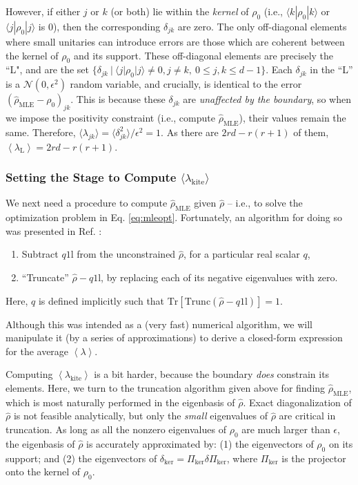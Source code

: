 \documentclass[aps,pra, twocolumn]{revtex4-1}
\newcommand{\Tr}{\mathrm{Tr}}
\newcommand{\Id}{\mathbb{I}}
\newcommand{\expect}[1]{\ensuremath{\left\langle#1\right\rangle}}
\def\Id{1\!\mathrm{l}}
\newcommand{\rhohat}{\hat{\rho}}
\newcommand{\rhoMLE}{\rhohat_{\scriptscriptstyle\mathrm{MLE}}}
\begin{document}
However, if either $j$ or $k$ (or both) lie within the \emph{kernel} of $\rho_{0}$ (i.e., $\langle k | \rho_{0}| k \rangle$ or $\langle j|\rho_{0}|j\rangle$ is 0), then the corresponding $\delta_{jk}$ are zero. The only off-diagonal elements where small unitaries can introduce errors are those which are coherent between the kernel of $\rho_{0}$ and its support. These off-diagonal elements are precisely the ``L", and are  the set $\{\delta_{jk}~|~\langle j | \rho_{0}|j\rangle \neq 0, j\neq k, ~ 0 \leq j,k \leq d - 1\}$. Each $\delta_{jk}$ in the ``L'' is a $\mathcal{N}(0, \epsilon^{2})$ random variable, and crucially, is identical to the error $(\rhoMLE - \rho_{0})_{jk}$. This is because these $\delta_{jk}$ are \emph{unaffected by the boundary}, so when we impose the positivity constraint (i.e., compute $\rhoMLE$), their values remain the same. Therefore, $\langle \lambda_{jk}\rangle = \langle \delta_{jk}^{2}\rangle /\epsilon^{2} = 1$. As there are $2rd - r(r+1)$ of them, $\expect{\lambda_{\mathrm{L}}} = 2rd - r(r+1)$.

\subsubsection{Setting the Stage to Compute $\langle \lambda_\mathrm{kite}\rangle$}

We next need a procedure to compute $\rhoMLE$ given $\rhohat$ -- i.e., to solve the optimization problem in Eq. \eqref{eq:mleopt}.  Fortunately, an algorithm for doing so was presented in Ref. \cite{Smolin2012}:
\begin{enumerate}[noitemsep]
\item Subtract $q\Id$ from the unconstrained $\hat\rho$, for a particular real scalar $q$,
\item ``Truncate'' $\hat\rho-q\Id$, by replacing each of its negative eigenvalues with zero.
\end{enumerate}
Here, $q$ is defined implicitly such that $\Tr\left[ \mathrm{Trunc}(\hat\rho-q\Id)\right] = 1$.

Although this was intended as a (very fast) numerical algorithm, we will manipulate it (by a series of approximations) to derive a closed-form expression for the average $\expect{\lambda}$.  

Computing $\expect{\lambda_{\mathrm{kite}}}$ is a bit harder, because the boundary \emph{does} constrain its elements.  Here, we turn to the truncation algorithm given above for finding $\rhoMLE$, which is most naturally performed in the eigenbasis of $\hat\rho$.  Exact diagonalization of $\hat\rho$ is not feasible analytically, but only the \emph{small} eigenvalues of $\hat\rho$ are critical in truncation.  As long as all the nonzero eigenvalues of $\rho_0$ are much larger than $\epsilon$, the eigenbasis of $\hat\rho$ is accurately approximated by: (1) 
the eigenvectors of $\rho_0$ on its support; and (2) the eigenvectors of $\delta_{\mathrm{ker}} = \Pi_{\mathrm{ker}}\delta\Pi_{\mathrm{ker}}$, where $\Pi_{\mathrm{ker}}
$ is the projector onto the kernel of $\rho_0$.
\end{document}

